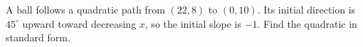 A ball follows a quadratic path from $(22,8)$ to $(0,10)$. Its initial direction is $45^\circ$ upward toward decreasing $x$, so the initial slope is $-1$. Find the quadratic in standard form.
